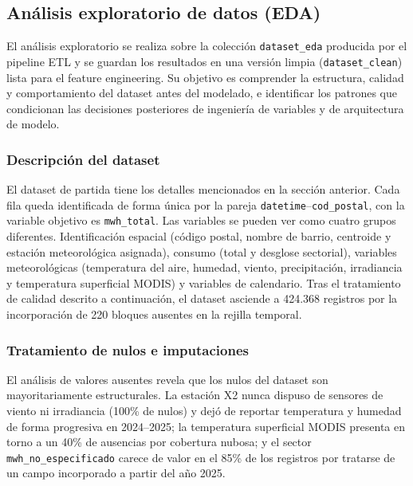 \documentclass[12pt, a4paper]{article}
\begin{document}
\subsection{Análisis exploratorio de datos (EDA)}

El análisis exploratorio se realiza sobre la colección \texttt{dataset\_eda} producida por el pipeline ETL y se guardan los  resultados en una versión limpia (\texttt{dataset\_clean}) lista para el feature engineering. Su objetivo es comprender la estructura, calidad y comportamiento del dataset antes del modelado, e identificar los patrones que condicionan las decisiones posteriores de ingeniería de variables y de arquitectura de modelo.

\subsubsection{Descripción del dataset}

El dataset de partida tiene los detalles mencionados en la sección anterior. Cada fila queda identificada de forma única por la pareja \texttt{datetime}--\texttt{cod\_postal}, con la variable objetivo es \texttt{mwh\_total}. Las variables se pueden ver como cuatro grupos diferentes. Identificación espacial (código postal, nombre de barrio, centroide y estación meteorológica asignada), consumo (total y desglose sectorial), variables meteorológicas (temperatura del aire, humedad, viento, precipitación, irradiancia y temperatura superficial MODIS) y variables de calendario. Tras el tratamiento de calidad descrito a continuación, el dataset asciende a 424.368 registros por la incorporación de 220 bloques ausentes en la rejilla temporal.

\subsubsection{Tratamiento de nulos e imputaciones}

El análisis de valores ausentes revela que los nulos del dataset son mayoritariamente estructurales. La estación X2 nunca dispuso de sensores de viento ni irradiancia (100\% de nulos) y dejó de reportar temperatura y humedad de forma progresiva en 2024--2025; la temperatura superficial MODIS presenta en torno a un 40\% de ausencias por cobertura nubosa; y el sector \texttt{mwh\_no\_especificado} carece de valor en el 85\% de los registros por tratarse de un campo incorporado a partir del año 2025.
\end{document}
